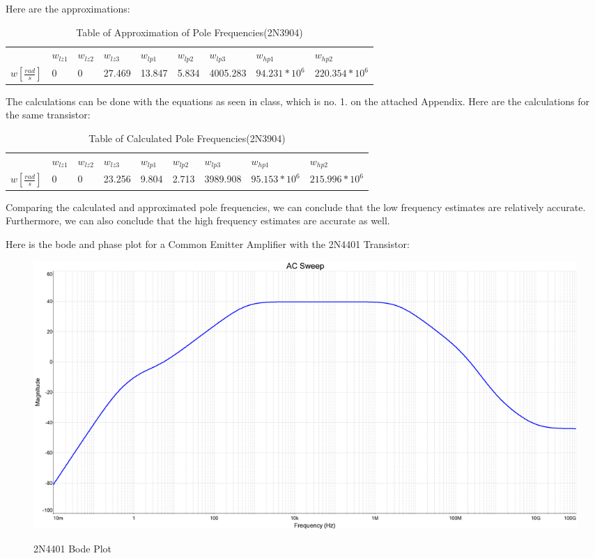 \documentclass[12pt]{article}
\begin{document}
Here are the approximations:
\begin{table}[h!]
\centering
\begin{tabular}{|l|l|l|l|l|l|l|l|l|}
\cline{1-2} \cline{3-9}
             & $w_{lz1}$ & $w_{lz2}$ & $w_{lz3}$ & $w_{lp1}$  & $w_{lp2}$  & $w_{lp3}$     & $w_{hp1}$          & $w_{hp2}$           \\ \cline{1-2} \cline{3-9}
$w[\frac{rad}{s}]$ &  0    & 0     & 27.469      & 13.847 & 5.834 & 4005.283 & $94.231*10^6$ & $220.354*10^6$ \\
\hline
\end{tabular}
\caption{Table of Approximation of Pole Frequencies(2N3904)}
\label{table:2N3904_Approximation_Poles}
\end{table}

The calculations can be done with the equations as seen in class, which is no. 1. on the attached Appendix. 
Here are the calculations for the same transistor:
\begin{table}[h!]
\centering
\begin{tabular}{|l|l|l|l|l|l|l|l|l|}
\cline{1-2} \cline{3-9}
             & $w_{lz1}$ & $w_{lz2}$ & $w_{lz3}$ & $w_{lp1}$  & $w_{lp2}$  & $w_{lp3}$     & $w_{hp1}$          & $w_{hp2}$           \\ \cline{1-2} \cline{3-9}
$w[\frac{rad}{s}]$ &  0    & 0     & 23.256      & 9.804 & 2.713 & 3989.908 & $95.153*10^6$ & $215.996*10^6$ \\
\hline
\end{tabular}
\caption{Table of Calculated Pole Frequencies(2N3904)}
\label{table:2N3904_Calculated_Poles}
\end{table}

Comparing the calculated and approximated pole frequencies, we can conclude that the low frequency estimates are relatively accurate. Furthermore, we can also conclude that the high frequency estimates are accurate as well.


Here is the bode and phase plot for a Common Emitter Amplifier with the 2N4401 Transistor:

\begin{figure}[H]
\centering
\includegraphics[height=0.45\textwidth]{Images/2a_2N4401}\\
\caption{2N4401 Bode Plot}
\label{fig:part2a_bodeplot_2N4401}
\end{figure}
\end{document}
